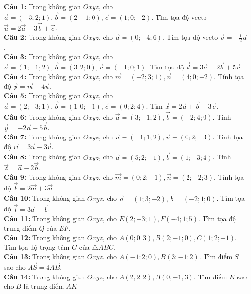 \documentclass[12pt]{article}
\begin{document}
	\begin{btdo}
		\noindent \textbf{Câu 1:} Trong không gian $Oxyz$, cho $\vec{a} = (-3; 2; 1), \vec{b} = (2; -1; 0), \vec{c} = (1; 0; -2)$. Tìm tọa độ vecto $\vec{u} = 2\vec{a} - 3\vec{b} + \vec{c}$. \\
		\noindent \textbf{Câu 2:} Trong không gian $Oxyz$, cho $\vec{a} = (0; -4; 6)$. Tìm tọa độ vecto $\vec{v} = -\frac{1}{2}\vec{a}$. \\
		\noindent \textbf{Câu 3:} Trong không gian $Oxyz$, cho $\vec{a} = (1; -1; 2), \vec{b} = (3; 2; 0), \vec{c} = (-1; 0; 1)$. Tìm tọa độ $\vec{d} = 3\vec{a} - 2\vec{b} + 5\vec{c}$. \\
		\noindent \textbf{Câu 4:} Trong không gian $Oxyz$, cho $\vec{m} = (-2; 3; 1), \vec{n} = (4; 0; -2)$. Tính tọa độ $\vec{p} = \vec{m} + 4\vec{n}$. \\
		\noindent \textbf{Câu 5:} Trong không gian $Oxyz$, cho $\vec{a} = (2; -3; 1), \vec{b} = (1; 0; -1), \vec{c} = (0; 2; 4)$. Tìm $\vec{x} = 2\vec{a} + \vec{b} - 3\vec{c}$. \\
		\noindent \textbf{Câu 6:} Trong không gian $Oxyz$, cho $\vec{a} = (3; -1; 2), \vec{b} = (-2; 4; 0)$. Tính $\vec{y} = -2\vec{a} + 5\vec{b}$. \\
		\noindent \textbf{Câu 7:} Trong không gian $Oxyz$, cho $\vec{u} = (-1; 1; 2), \vec{v} = (0; 2; -3)$. Tính tọa độ $\vec{w} = 3\vec{u} - 3\vec{v}$. \\
		\noindent \textbf{Câu 8:} Trong không gian $Oxyz$, cho $\vec{a} = (5; 2; -1), \vec{b} = (1; -3; 4)$. Tính $\vec{z} = \vec{a} - 2\vec{b}$. \\
		\noindent \textbf{Câu 9:} Trong không gian $Oxyz$, cho $\vec{m} = (0; 2; -1), \vec{n} = (2; -2; 3)$. Tính tọa độ $\vec{k} = 2\vec{m} + 3\vec{n}$. \\
		\noindent \textbf{Câu 10:} Trong không gian $Oxyz$, cho $\vec{a} = (1; 3; -2), \vec{b} = (-2; 1; 0)$. Tìm tọa độ $\vec{t} = 3\vec{a} - \vec{b}$. \\
		\noindent \textbf{Câu 11:} Trong không gian $Oxyz$, cho $E(2; -3; 1), F(-4; 1; 5)$. Tìm tọa độ trung điểm $Q$ của $EF$. \\
		\noindent \textbf{Câu 12:} Trong không gian $Oxyz$, cho $A(0; 0; 3), B(2; -1; 0), C(1; 2; -1)$. Tìm tọa độ trọng tâm $G$ của $\triangle ABC$. \\
		\noindent \textbf{Câu 13:} Trong không gian $Oxyz$, cho $A(-1; 2; 0), B(3; -1; 2)$. Tìm điểm $S$ sao cho $\vec{AS} = 4\vec{AB}$. \\
		\noindent \textbf{Câu 14:} Trong không gian $Oxyz$, cho $A(2; 2; 2), B(0; -1; 3)$. Tìm điểm $K$ sao cho $B$ là trung điểm $AK$. \\

\end{btdo}
\end{document}
